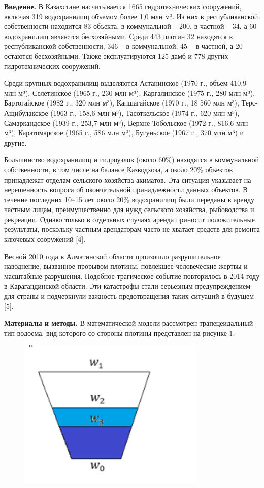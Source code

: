 {{\bfseries Введение.} В Казахстане насчитывается 1665 гидротехнических
сооружений, включая 319 водохранилищ объемом более 1,0 млн м³. Из них в
республиканской собственности находится 83 объекта, в коммунальной --
200, в частной -- 34, а 60 водохранилищ являются бесхозяйными. Среди 443
плотин 32 находятся в республиканской собственности, 346 -- в
коммунальной, 45 -- в частной, а 20 остаются бесхозяйными. Также
эксплуатируются 125 дамб и 778 других гидротехнических сооружений.

Среди крупных водохранилищ выделяются Астанинское (1970 г., объем 410,9
млн м³), Селетинское (1965 г., 230 млн м³), Каргалинское (1975 г., 280
млн м³), Бартогайское (1982 г., 320 млн м³), Капшагайское (1970 г., 18
560 млн м³), Терс-Ащибулакское (1963 г., 158,6 млн м³), Тасоткельское
(1974 г., 620 млн м³), Самаркандское (1939 г., 253,7 млн м³),
Верхне-Тобольское (1972 г., 816,6 млн м³), Каратомарское (1965 г., 586
млн м³), Бугуньское (1967 г., 370 млн м³) и другие.

Большинство водохранилищ и гидроузлов (около 60\%) находятся в
коммунальной собственности, в том числе на балансе Казводхоза, а около
20\% объектов принадлежат отделам сельского хозяйства акиматов. Эта
ситуация указывает на нерешенность вопроса об окончательной
принадлежности данных объектов. В течение последних 10--15 лет около
20\% водохранилищ были переданы в аренду частным лицам, преимущественно
для нужд сельского хозяйства, рыбоводства и рекреации. Однако только в
отдельных случаях аренда приносит положительные результаты, поскольку
частным арендаторам часто не хватает средств для ремонта ключевых
сооружений {[}4{]}.

Весной 2010 года в Алматинской области произошло разрушительное
наводнение, вызванное прорывом плотины, повлекшее человеческие жертвы и
масштабные разрушения. Подобное трагическое событие повторилось в 2014
году в Карагандинской области. Эти катастрофы стали серьезным
предупреждением для страны и подчеркнули важность предотвращения таких
ситуаций в будущем {[}5{]}.

{\bfseries Материалы и методы.} В математической модели рассмотрен
трапецеидальный тип водоема, вид которого со стороны плотины представлен
на рисунке 1.

\begin{figure}[H]
	\centering
	\includegraphics[width=0.8\textwidth]{media/ict/image2}
	\caption*{}
\end{figure}

}
